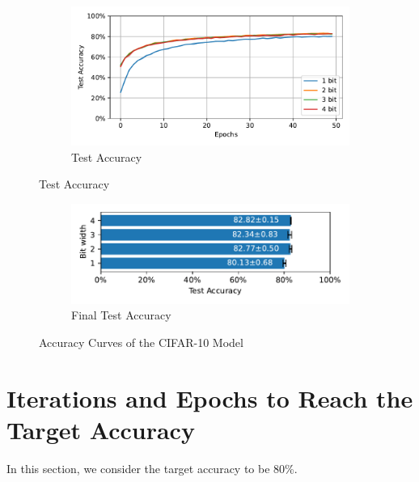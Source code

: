         \begin{figure}[H]
            \centering
            \ContinuedFloat
            \begin{subfigure}[H]{\textwidth}
                \centering
                \includegraphics[width=\textwidth]{../standard/CIFAR10/plots/cifar10_test_acc.pdf}
                \caption{Test Accuracy}
            \end{subfigure}
        \end{figure}
        \begin{figure}[H]
            \centering
            \ContinuedFloat
            \begin{subfigure}[H]{\textwidth}
                \centering
                \includegraphics[width=\textwidth]{../standard/CIFAR10/plots/cifar10_final_acc_horizontal.pdf}
                \caption{Final Test Accuracy}
            \end{subfigure}
            \caption{Accuracy Curves of the CIFAR-10 Model}
        \end{figure}

\section{Iterations and Epochs to Reach the Target Accuracy}
\label{appendix:iterations}
    In this section, we consider the target accuracy to be 80\%. 

